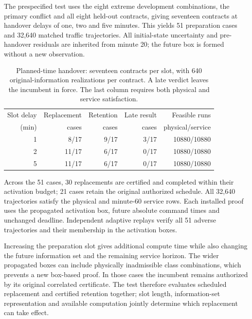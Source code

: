 \documentclass[preprint,12pt]{elsarticle}
\numberwithin{equation}{section}
\begin{document}
The prespecified test uses the eight extreme development combinations,
the primary conflict and all eight held-out contracts, giving seventeen
contracts at handover delays of one, two and five minutes. This yields
51 preparation cases and 32,640 matched traffic trajectories. All
initial-state uncertainty and pre-handover residuals are inherited from
minute 20; the future box is formed without a new observation.
\begin{table}[t]
\centering\small
\caption{Planned-time handover: seventeen contracts per slot, with 640 original-information realizations per contract. A late verdict leaves the incumbent in force. The last column requires both physical and service satisfaction.}
\label{supp:detail:tab:delayed-handover}
\begin{tabular}{@{}rrrrr@{}}
\toprule
Slot delay & Replacement & Retention & Late result & Feasible runs\\
(min) & cases & cases & cases & physical/service\\
\midrule
1 & 8/17 & 9/17 & 3/17 & 10880/10880\\
2 & 11/17 & 6/17 & 0/17 & 10880/10880\\
5 & 11/17 & 6/17 & 0/17 & 10880/10880\\
\bottomrule
\end{tabular}
\end{table}

Across the 51 cases, 30 replacements are certified and completed
within their activation budget; 21 cases retain the original
authorized schedule. All 32,640 trajectories satisfy the physical and
minute-60 service rows. Each installed proof uses the propagated activation
box, future absolute command times and unchanged deadline. Independent
adaptive replays verify all 51 adverse trajectories and their membership
in the activation boxes.

Increasing the preparation slot gives additional compute time while also
changing the future information set and the remaining service horizon.
The wider propagated boxes can include physically inadmissible class
combinations, which prevents a new box-based proof. In those cases the
incumbent remains authorized by its original correlated certificate.
The test therefore evaluates scheduled replacement and certified retention
together; slot length, information-set representation and available
computation jointly determine which replacement can take effect.
\end{document}
